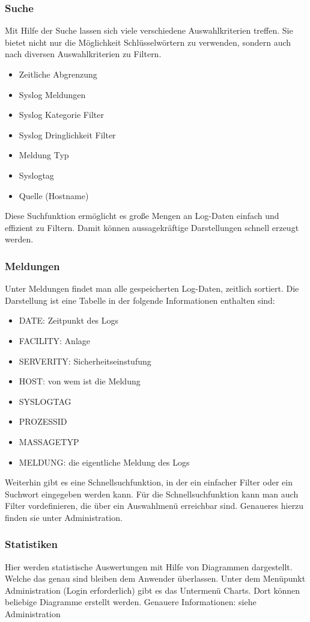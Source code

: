 \subsubsection*{Suche}
Mit Hilfe der Suche lassen sich viele verschiedene Auswahlkriterien treffen. Sie bietet nicht nur die Möglichkeit Schlüsselwörtern zu verwenden, sondern auch nach diversen Auswahlkriterien zu Filtern.
\begin{itemize}
\item Zeitliche Abgrenzung
\item Syslog Meldungen
\item Syslog Kategorie Filter
\item Syslog Dringlichkeit Filter
\item Meldung Typ
\item Syslogtag
\item Quelle (Hostname)
\end{itemize}

Diese Suchfunktion ermöglicht es große Mengen an Log-Daten einfach und effizient zu Filtern. Damit können aussagekräftige Darstellungen schnell erzeugt werden.

\subsubsection*{Meldungen}
Unter Meldungen findet man alle gespeicherten Log-Daten, zeitlich sortiert. Die Darstellung ist eine Tabelle in der folgende Informationen enthalten sind:
\begin{itemize}
\item DATE: Zeitpunkt des Logs
\item FACILITY: Anlage
\item SERVERITY:  Sicherheitseinstufung
\item HOST: von wem ist die Meldung
\item SYSLOGTAG
\item PROZESSID
\item MASSAGETYP
\item MELDUNG: die eigentliche Meldung des Logs
\end{itemize}

Weiterhin gibt es eine Schnellsuchfunktion, in der ein einfacher Filter oder ein Suchwort eingegeben werden kann. Für die Schnellsuchfunktion kann man auch Filter vordefinieren, die über ein Auswahlmenü erreichbar sind. Genaueres hierzu finden sie unter Administration.

\subsubsection*{Statistiken}
Hier werden statistische Auswertungen mit Hilfe von Diagrammen dargestellt. Welche das genau sind bleiben dem Anwender überlassen. Unter dem Menüpunkt Administration (Login erforderlich) gibt es das Untermenü Charts. Dort können beliebige Diagramme erstellt werden.
Genauere Informationen: siehe Administration

